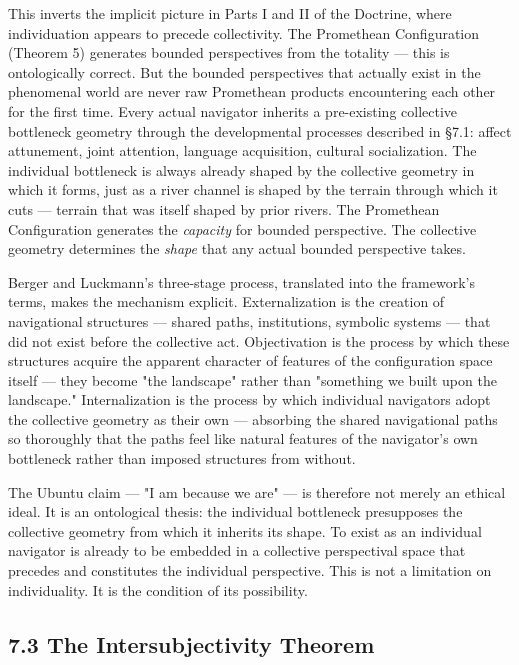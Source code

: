 This inverts the implicit picture in Parts I and II of the Doctrine, where individuation appears to precede collectivity. The Promethean Configuration (Theorem 5) generates bounded perspectives from the totality — this is ontologically correct. But the bounded perspectives that actually exist in the phenomenal world are never raw Promethean products encountering each other for the first time. Every actual navigator inherits a pre-existing collective bottleneck geometry through the developmental processes described in §7.1: affect attunement, joint attention, language acquisition, cultural socialization. The individual bottleneck is always already shaped by the collective geometry in which it forms, just as a river channel is shaped by the terrain through which it cuts — terrain that was itself shaped by prior rivers. The Promethean Configuration generates the \textit{capacity} for bounded perspective. The collective geometry determines the \textit{shape} that any actual bounded perspective takes.


Berger and Luckmann's three-stage process, translated into the framework's terms, makes the mechanism explicit. Externalization is the creation of navigational structures — shared paths, institutions, symbolic systems — that did not exist before the collective act. Objectivation is the process by which these structures acquire the apparent character of features of the configuration space itself — they become "the landscape" rather than "something we built upon the landscape." Internalization is the process by which individual navigators adopt the collective geometry as their own — absorbing the shared navigational paths so thoroughly that the paths feel like natural features of the navigator's own bottleneck rather than imposed structures from without.


The Ubuntu claim — "I am because we are" — is therefore not merely an ethical ideal. It is an ontological thesis: the individual bottleneck presupposes the collective geometry from which it inherits its shape. To exist as an individual navigator is already to be embedded in a collective perspectival space that precedes and constitutes the individual perspective. This is not a limitation on individuality. It is the condition of its possibility.


\bigskip\noindent\makebox[\textwidth]{\color{rulegray}\rule{5cm}{0.3pt}}\bigskip


\subsection*{7.3 The Intersubjectivity Theorem}


